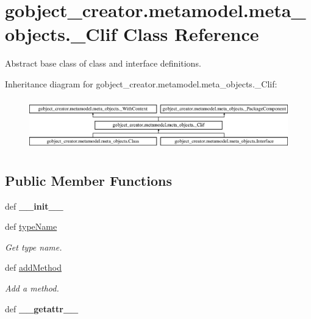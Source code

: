 \hypertarget{classgobject__creator_1_1metamodel_1_1meta__objects_1_1__Clif}{
\section{gobject\_\-creator.metamodel.meta\_\-objects.\_\-Clif Class Reference}
\label{classgobject__creator_1_1metamodel_1_1meta__objects_1_1__Clif}
}


Abstract base class of class and interface definitions.  


Inheritance diagram for gobject\_\-creator.metamodel.meta\_\-objects.\_\-Clif:\begin{figure}[H]
\begin{center}
\leavevmode
\includegraphics[height=2.25806cm]{classgobject__creator_1_1metamodel_1_1meta__objects_1_1__Clif}
\end{center}
\end{figure}
\subsection*{Public Member Functions}
\begin{DoxyCompactItemize}
\item 
\hypertarget{classgobject__creator_1_1metamodel_1_1meta__objects_1_1__Clif_a4b8d3f94552d1084ec3223e93cbf1095}{
def {\bfseries \_\-\_\-init\_\-\_\-}}
\label{classgobject__creator_1_1metamodel_1_1meta__objects_1_1__Clif_a4b8d3f94552d1084ec3223e93cbf1095}

\item 
def \hyperlink{classgobject__creator_1_1metamodel_1_1meta__objects_1_1__Clif_a906ce7adf382ff1f2377a4aff5fec782}{typeName}
\begin{DoxyCompactList}\small\item\em Get type name. \item\end{DoxyCompactList}\item 
def \hyperlink{classgobject__creator_1_1metamodel_1_1meta__objects_1_1__Clif_ab86417004a7ff2cdc6da0e125829d6d3}{addMethod}
\begin{DoxyCompactList}\small\item\em Add a method. \item\end{DoxyCompactList}\item 
\hypertarget{classgobject__creator_1_1metamodel_1_1meta__objects_1_1__Clif_afdbcd6755857b2dd4085261753d3971c}{
def {\bfseries \_\-\_\-getattr\_\-\_\-}}
\label{classgobject__creator_1_1metamodel_1_1meta__objects_1_1__Clif_afdbcd6755857b2dd4085261753d3971c}

\end{DoxyCompactItemize}
